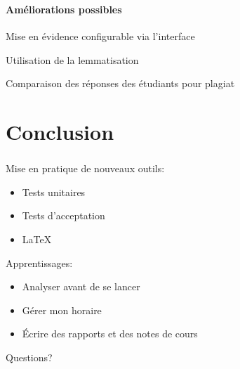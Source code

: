 \documentclass{beamer}
\begin{document}
  \begin{frame}
  \frametitle{\insertsection}
  \framesubtitle{Am\'eliorations possibles}
  Mise en \'evidence configurable via l'interface
  
  Utilisation de la lemmatisation
  
  Comparaison des r\'eponses des \'etudiants pour plagiat
  \end{frame}
  \section[Conclusion]{Conclusion}
  \begin{frame}
  \frametitle{\insertsection}
  Mise en pratique de nouveaux outils:
  \begin{itemize}
    \item Tests unitaires
    \item Tests d'acceptation
    \item \LaTeX
  \end{itemize}
  
  Apprentissages:
  \begin{itemize}
    \item Analyser avant de se lancer
    \item G\'erer mon horaire
    \item \'Ecrire des rapports et des notes de cours
  \end{itemize}
  \end{frame}
  
  \begin{frame}
  \begin{center}
  \Huge Questions?
  \end{center}
  \end{frame}
\end{document}
